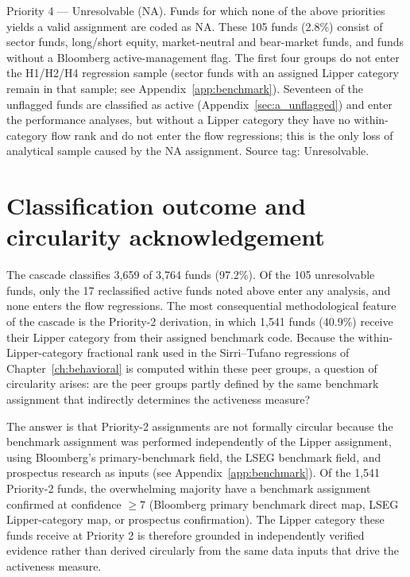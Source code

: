 \documentclass[12pt, oneside]{report}
\begin{document}
Priority 4 --- Unresolvable (NA). Funds for which none of
the above priorities yields a valid assignment are coded as NA. These
105 funds (2.8\%) consist of sector funds, long/short equity,
market-neutral and bear-market funds, and funds without a Bloomberg
active-management flag. The first four groups do not enter the H1/H2/H4
regression sample (sector funds with an assigned Lipper category remain
in that sample; see Appendix~\ref{app:benchmark}). Seventeen of the
unflagged funds are classified as active
(Appendix~\ref{sec:a_unflagged}) and enter the performance analyses, but
without a Lipper category they have no within-category flow rank and do
not enter the flow regressions; this is the only loss of analytical
sample caused by the NA assignment. Source tag: Unresolvable.

\section{Classification outcome and circularity acknowledgement}
\label{sec:lipper_outcome}

\noindent The cascade classifies 3{,}659 of 3{,}764 funds (97.2\%).
Of the 105 unresolvable funds, only the 17 reclassified active funds
noted above enter any analysis, and none enters the flow regressions. The most consequential methodological feature of the
cascade is the Priority-2 derivation, in which 1{,}541 funds (40.9\%)
receive their Lipper category from their assigned benchmark code.
Because the within-Lipper-category fractional rank used in the
Sirri--Tufano regressions of Chapter~\ref{ch:behavioral} is computed
within these peer groups, a question of circularity arises: are the
peer groups partly defined by the same benchmark assignment that
indirectly determines the activeness measure?

The answer is that Priority-2 assignments are not formally circular
because the benchmark assignment was performed independently of the
Lipper assignment, using Bloomberg's primary-benchmark field, the
LSEG benchmark field, and prospectus research as inputs (see
Appendix~\ref{app:benchmark}). Of the 1{,}541 Priority-2 funds, the
overwhelming majority have a benchmark assignment confirmed at
confidence $\geq 7$ (Bloomberg primary benchmark direct map, LSEG
Lipper-category map, or prospectus confirmation). The Lipper
category these funds receive at Priority 2 is therefore grounded in
independently verified evidence rather than derived circularly from
the same data inputs that drive the activeness measure.
\end{document}
